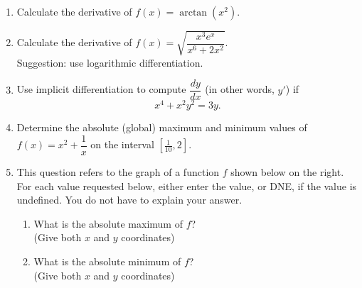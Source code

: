 \documentclass[12pt]{article}
\newcommand{\points}[1]{\marginpar{\hspace{24pt}[#1]}}
\begin{document}
 \begin{enumerate}
 \item  Calculate the derivative of $f(x) = \arctan(x^2)$. \points{2}
 
 \vspace{4cm}
 
 \item Calculate the derivative of $f(x) = \sqrt{\dfrac{x^3e^x}{x^6+2x^2}}$. \points{4}\\
 Suggestion: use logarithmic differentiation.
 
 \vspace{6cm}
 
 \item Use implicit differentiation to compute $\dfrac{dy}{dx}$ (in other words, $y'$) if \points{4}
 \[
 x^4+x^2y^2=3y.
 \]
 
 \newpage
 
 \item Determine the absolute (global) maximum and minimum values of $f(x) = x^2+\dfrac{1}{x}$ on the interval $[\frac{1}{10},2]$. \points{4}

  
  \vspace{10cm}
  
 \item This question refers to the graph of a function $f$ shown below on the right. For each value requested below, either enter the value, or DNE, if the value is undefined. You do not have to explain your answer.\points{4}
 \begin{multicols}{2}
 \begin{enumerate}
 \item What is the absolute maximum of $f$?\\
 (Give both $x$ and $y$ coordinates)
 
 \vspace{1cm}
 
 \item What is the absolute minimum of $f$?\\
  (Give both $x$ and $y$ coordinates)

\vspace{1cm}


\end{enumerate}
\end{multicols}
\end{enumerate}
\end{document}
